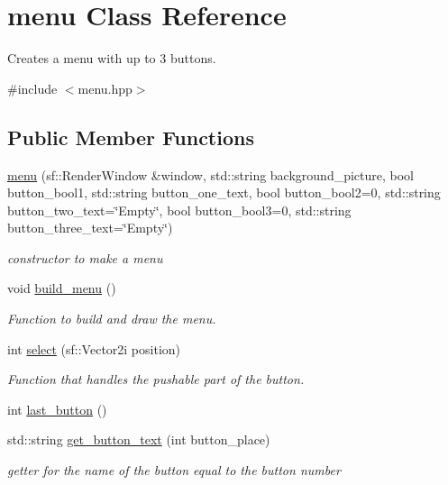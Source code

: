 \hypertarget{classmenu}{}\section{menu Class Reference}
\label{classmenu}


Creates a menu with up to 3 buttons.  




{\ttfamily \#include $<$menu.\+hpp$>$}

\subsection*{Public Member Functions}
\begin{DoxyCompactItemize}
\item 
\hyperlink{classmenu_a1c6f1319ba2123f9654df695725e83b4}{menu} (sf\+::\+Render\+Window \&window, std\+::string background\+\_\+picture, bool button\+\_\+bool1, std\+::string button\+\_\+one\+\_\+text, bool button\+\_\+bool2=0, std\+::string button\+\_\+two\+\_\+text=\char`\"{}Empty\char`\"{}, bool button\+\_\+bool3=0, std\+::string button\+\_\+three\+\_\+text=\char`\"{}Empty\char`\"{})
\begin{DoxyCompactList}\small\item\em constructor to make a menu \end{DoxyCompactList}\item 
void \hyperlink{classmenu_a8d194b462b1b180086e5b06a2dbfbdff}{build\+\_\+menu} ()
\begin{DoxyCompactList}\small\item\em Function to build and draw the menu. \end{DoxyCompactList}\item 
int \hyperlink{classmenu_a06744d58a2aad693d3637d0485aa7984}{select} (sf\+::\+Vector2i position)
\begin{DoxyCompactList}\small\item\em Function that handles the pushable part of the button. \end{DoxyCompactList}\item 
int \hyperlink{classmenu_ab572ef3baf462b15322e37278d81494c}{last\+\_\+button} ()
\item 
std\+::string \hyperlink{classmenu_aa4b8f6e9c87b8fa413a830af33429c85}{get\+\_\+button\+\_\+text} (int button\+\_\+place)
\begin{DoxyCompactList}\small\item\em getter for the name of the button equal to the button number \end{DoxyCompactList}\end{DoxyCompactItemize}


